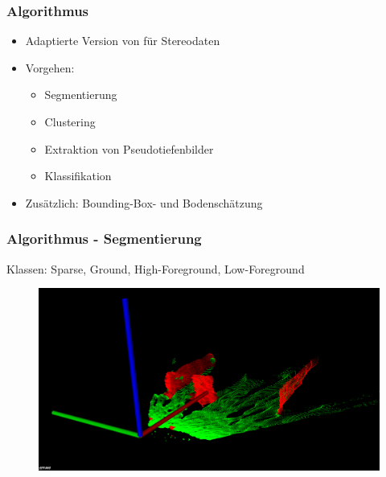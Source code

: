 \begin{frame}
    \frametitle{Algorithmus}
    \begin{itemize}
        \item Adaptierte Version von \cite{AttBen17} für Stereodaten
            \pause
        \item Vorgehen: 
            \pause
            \begin{itemize}
                \item Segmentierung
                    \pause
                \item Clustering
                    \pause
                \item Extraktion von Pseudotiefenbilder
                    \pause
                \item Klassifikation
                    \pause
            \end{itemize}
        \item Zusätzlich: Bounding-Box- und Bodenschätzung
    \end{itemize}
\end{frame}

\begin{frame}
    \frametitle{Algorithmus - Segmentierung}
    Klassen: Sparse, Ground, High-Foreground, Low-Foreground
    \begin{figure}
        \centering
        \includegraphics[width=\textwidth]{../Material/Presentation/grid.png}
    \end{figure}
\end{frame}


